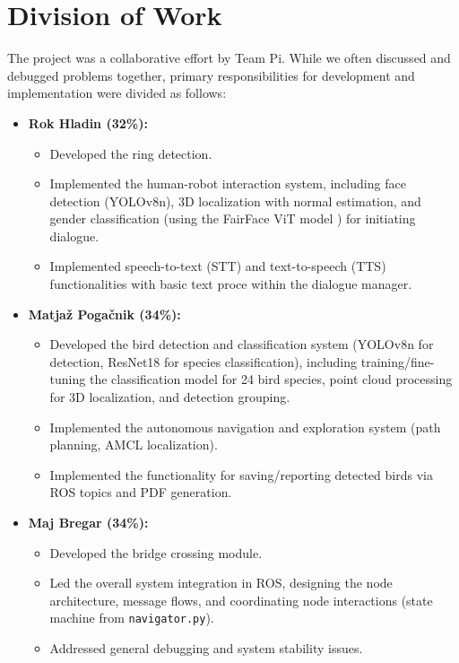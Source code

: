 \documentclass[a4paper]{article}
\begin{document}
\section{Division of Work}
The project was a collaborative effort by Team Pi. While we often discussed and debugged problems together, primary responsibilities for development and implementation were divided as follows:

\begin{itemize}
    \item \textbf{Rok Hladin (32\%):}
        \begin{itemize}
            \item Developed the ring detection.
            \item Implemented the human-robot interaction system, including face detection (YOLOv8n), 3D localization with normal estimation, and gender classification (using the FairFace ViT model \cite{FairFaceGenderModel}) for initiating dialogue.
            \item Implemented speech-to-text (STT) and text-to-speech (TTS) functionalities with basic text proce within the dialogue manager.
        \end{itemize}
    \item \textbf{Matjaž Pogačnik (34\%):}
        \begin{itemize}
            \item Developed the bird detection and classification system (YOLOv8n for detection, ResNet18 for species classification), including training/fine-tuning the classification model for 24 bird species, point cloud processing for 3D localization, and detection grouping.
            \item Implemented the autonomous navigation and exploration system (path planning, AMCL localization).
            \item Implemented the functionality for saving/reporting detected birds via ROS topics and PDF generation.
        \end{itemize}
    \item \textbf{Maj Bregar (34\%):}
        \begin{itemize}
            \item Developed the bridge crossing module.
            \item Led the overall system integration in ROS, designing the node architecture, message flows, and coordinating node interactions (state machine from \texttt{navigator.py}).
            \item Addressed general debugging and system stability issues.
        \end{itemize}
\end{itemize}
\end{document}
